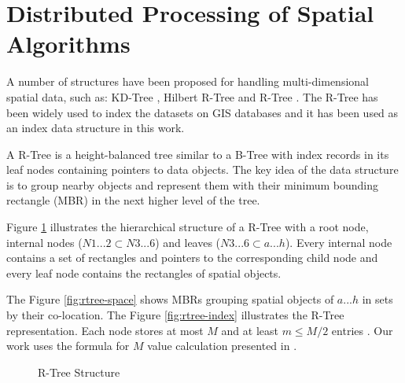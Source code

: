 \section{Distributed Processing of Spatial Algorithms}
\label{sec:spatial_dist}		
A number of structures have been proposed for handling multi-dimensional spatial data, such as: 
KD-Tree \cite{bentley1975multidimensional}, Hilbert R-Tree \cite{kamel1994hilbert} and R-Tree \cite{guttman1984r}.
The R-Tree has been widely used to index the datasets on GIS databases and it has been used as an index data structure in this work.

A R-Tree is a height-balanced tree similar to a B-Tree \cite{comer1979ubiquitous} with index records in its leaf nodes containing pointers to data objects. 
The key idea of the data structure is to group nearby objects and represent them with their minimum bounding rectangle (MBR) in the next higher level of the tree. 

Figure \ref{fig:rtree} illustrates the hierarchical structure of a R-Tree with a root node, internal nodes ($N1...2 \subset N3...6$) and leaves ($N3...6 \subset a...h$). 
Every internal node contains a set of rectangles and pointers to the corresponding child node and every leaf node contains the rectangles of spatial objects.

The Figure \ref{fig:rtree-space} shows MBRs grouping spatial objects of $a...h$ in sets by their co-location. 
The Figure \ref{fig:rtree-index} illustrates the R-Tree representation. Each node stores at most $M$ and at least $m \leq M/2$ entries \cite{guttman1984r}. 
Our work uses the formula for $M$ value calculation presented in \cite{dedsi}.

\begin{figure}[h]
  \centering
   \qquad
  \caption{R-Tree Structure}
  \label{fig:rtree}
\end{figure}


